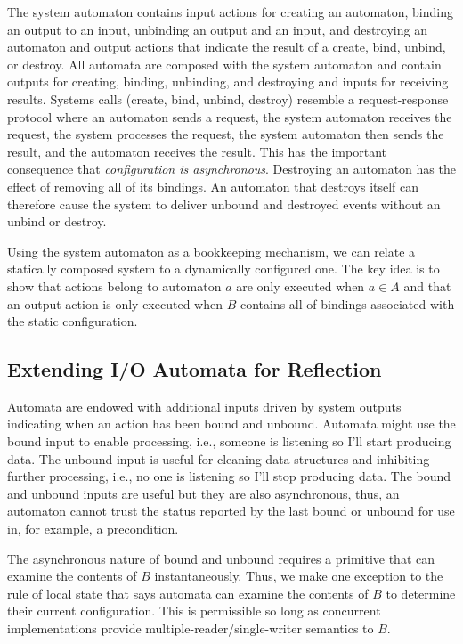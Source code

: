The system automaton contains input actions for creating an automaton, binding an output to an input, unbinding an output and an input, and destroying an automaton and output actions that indicate the result of a create, bind, unbind, or destroy.
All automata are composed with the system automaton and contain outputs for creating, binding, unbinding, and destroying and inputs for receiving results.
Systems calls (create, bind, unbind, destroy) resemble a request-response protocol where an automaton sends a request, the system automaton receives the request, the system processes the request, the system automaton then sends the result, and the automaton receives the result.
This has the important consequence that \emph{configuration is asynchronous}.
Destroying an automaton has the effect of removing all of its bindings.
An automaton that destroys itself can therefore cause the system to deliver unbound and destroyed events without an unbind or destroy.

Using the system automaton as a bookkeeping mechanism, we can relate a statically composed system to a dynamically configured one.
The key idea is to show that actions belong to automaton $a$ are only executed when $a \in A$ and that an output action is only executed when $B$ contains all of bindings associated with the static configuration.






\subsection{Extending I/O Automata for Reflection}

Automata are endowed with additional inputs driven by system outputs indicating when an action has been bound and unbound.
Automata might use the bound input to enable processing, i.e., someone is listening so I'll start producing data.
The unbound input is useful for cleaning data structures and inhibiting further processing, i.e., no one is listening so I'll stop producing data.
The bound and unbound inputs are useful but they are also asynchronous, thus, an automaton cannot trust the status reported by the last bound or unbound for use in, for example, a precondition.

The asynchronous nature of bound and unbound requires a primitive that can examine the contents of $B$ instantaneously.
Thus, we make one exception to the rule of local state that says automata can examine the contents of $B$ to determine their current configuration.
This is permissible so long as concurrent implementations provide multiple-reader/single-writer semantics to $B$.

